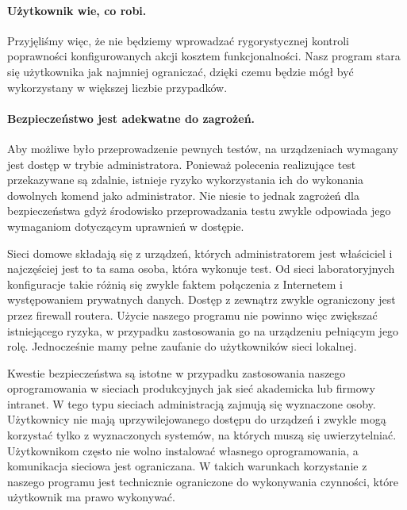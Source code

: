 \documentclass[00-praca-magisterska.tex]{subfiles}
\begin{document}
\paragraph{Użytkownik wie, co robi.} Przyjęliśmy więc, że nie będziemy
wprowadzać rygorystycznej kontroli poprawności konfigurowanych akcji kosztem
funkcjonalności. Nasz program stara się użytkownika jak najmniej ograniczać,
dzięki czemu będzie mógł być wykorzystany w większej liczbie przypadków.

\paragraph{Bezpieczeństwo jest adekwatne do zagrożeń.} Aby możliwe było
przeprowadzenie pewnych testów, na urządzeniach wymagany jest dostęp w trybie
administratora. Ponieważ polecenia realizujące test przekazywane są zdalnie,
istnieje ryzyko wykorzystania ich do wykonania dowolnych komend jako
administrator. Nie niesie to jednak zagrożeń dla bezpieczeństwa gdyż środowisko
przeprowadzania testu zwykle odpowiada jego wymaganiom dotyczącym uprawnień w
dostępie.


Sieci domowe składają się z urządzeń, których administratorem jest właściciel i
najczęściej jest to ta sama osoba, która wykonuje test. Od sieci laboratoryjnych
konfiguracje takie różnią się zwykle faktem połączenia z Internetem i
występowaniem prywatnych danych. Dostęp z zewnątrz zwykle ograniczony jest przez
firewall routera. Użycie naszego programu nie powinno więc zwiększać
istniejącego ryzyka, w przypadku zastosowania go na urządzeniu pełniącym jego
rolę. Jednocześnie mamy pełne zaufanie do użytkowników sieci lokalnej.

Kwestie bezpieczeństwa są istotne w przypadku zastosowania naszego
oprogramowania w sieciach produkcyjnych jak sieć akademicka lub firmowy
intranet. W tego typu sieciach administracją zajmują się wyznaczone osoby.
Użytkownicy nie mają uprzywilejowanego dostępu do urządzeń i zwykle mogą
korzystać tylko z wyznaczonych systemów, na których muszą się uwierzytelniać.
Użytkownikom często nie wolno instalować własnego oprogramowania, a komunikacja
sieciowa jest ograniczana. W takich warunkach korzystanie z naszego programu
jest technicznie ograniczone do wykonywania czynności, które użytkownik ma prawo
wykonywać. 
\end{document}
